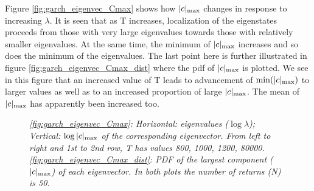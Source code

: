 \documentclass{report}
\begin{document}
Figure \ref{fig:garch_eigenvec_Cmax} shows how $|c|_{\text{max}}$ changes
in response to increasing $\lambda$. It is seen that as T increases,
localization of the eigenstates proceeds from those with very
large eigenvalues towards those with relatively smaller
eigenvalues. At the same time, the minimum of $|c|_{\text{max}}$ increases
and so does the minimum of the eigenvalues. The last point here is
further illustrated in figure \ref{fig:garch_eigenvec_Cmax_dist} where
the \gls{pdf} of $|c|_{\text{max}}$ is plotted. We see in this figure that an
increased value of T leads to advancement of $\min(|c|_{\text{max}})$ to larger
values as well as to an increased proportion of large $|c|_{\text{max}}$. The
mean of $|c|_{\text{max}}$ has apparently been increased too.
\begin{figure}[htb!]
  \centering
  \caption{\small \it \ref{fig:garch_eigenvec_Cmax}: Horizontal:
    eigenvalues ($\log \lambda$); Vertical: $\log |c|_{\text{max}}$ of the
    corresponding eigenvector. From left to right and 1st to 2nd row,
    T has values 800, 1000, 1200,
    80000. \ref{fig:garch_eigenvec_Cmax_dist}: PDF of the largest
    component ($|c|_{\text{max}}$) of each eigenvector. In both plots the number
    of returns (N) is 50.}

\end{figure}
\end{document}
